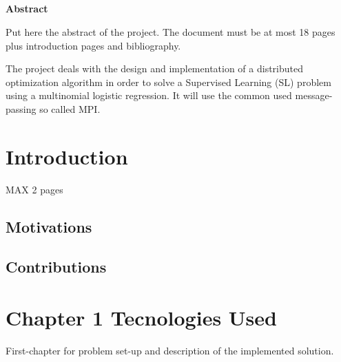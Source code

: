 \documentclass[a4paper,11pt,oneside]{book}
\begin{document}
\pagestyle{myheadings}



\newpage
\thispagestyle{empty}

\begin{center}
\chapter*{}
\thispagestyle{empty}
{\Huge \textbf{Abstract}}\\
\vspace{15mm}
\end{center}
Put here the abstract of the project. The document must be at most 18 pages plus
introduction pages and bibliography.

The project deals with the design and implementation of a distributed
optimization algorithm in order to solve a Supervised Learning (SL) problem using a multinomial logistic regression.
It will use the common used message-passing so called MPI. 


\tableofcontents \thispagestyle{empty}
\listoffigures\thispagestyle{empty}

\chapter*{Introduction}
MAX 2 pages
\section*{Motivations}
\section*{Contributions}

\chapter{Chapter 1 Tecnologies Used}
First-chapter for problem set-up and description of the implemented solution. 
\end{document}
